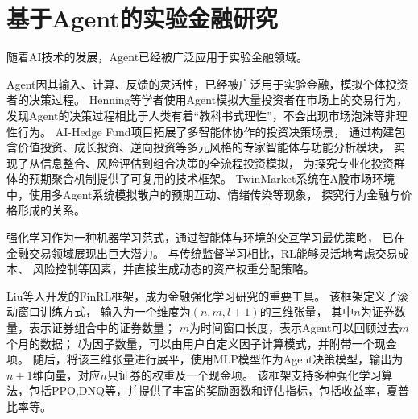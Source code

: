 \section{基于Agent的实验金融研究}  
随着AI技术的发展，Agent已经被广泛应用于实验金融领域\cite{ahmed2022artificial}。

Agent因其输入、计算、反馈的灵活性，已经被广泛用于实验金融，模拟个体投资者的决策过程。
Henning等学者\cite{henning2025llm}使用Agent模拟大量投资者在市场上的交易行为，
发现Agent的决策过程相比于人类有着“教科书式理性”，不会出现市场泡沫等非理性行为。
AI-Hedge Fund项目拓展了多智能体协作的投资决策场景，
通过构建包含价值投资、成长投资、逆向投资等多元风格的专家智能体与功能分析模块，
实现了从信息整合、风险评估到组合决策的全流程投资模拟，
为探究专业化投资群体的预期聚合机制提供了可复用的技术框架\cite{virattt2025aihedgefund}。
TwinMarket系统在A股市场环境中，使用多Agent系统模拟散户的预期互动、情绪传染等现象，
探究行为金融与价格形成的关系\cite{yang2025twinmarket}。

强化学习作为一种机器学习范式，通过智能体与环境的交互学习最优策略，
已在金融交易领域展现出巨大潜力。
与传统监督学习相比，RL能够灵活地考虑交易成本、
风险控制等因素，并直接生成动态的资产权重分配策略\cite{bai2025review}\cite{qureshi2026deep}。

Liu等人\cite{liu2021finrl}开发的FinRL框架，成为金融强化学习研究的重要工具。
该框架定义了滚动窗口训练方式，
输入为一个维度为$(n,m,l+1)$的三维张量，
其中$n$为证券数量，表示证券组合中的证券数量；
$m$为时间窗口长度，表示Agent可以回顾过去$m$个月的数据；
$l$为因子数量，可以由用户自定义因子计算模式，并附带一个现金项。   
随后，将该三维张量进行展平，使用MLP模型作为Agent决策模型，输出为$n+1$维向量，对应$n$只证券的权重及一个现金项。  
该框架支持多种强化学习算法，包括PPO,DNQ等，并提供了丰富的奖励函数和评估指标，包括收益率，夏普比率等。   






